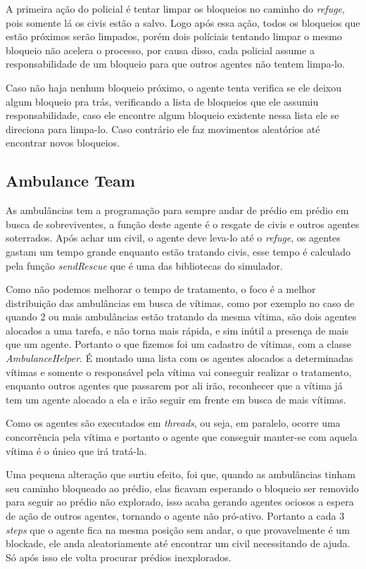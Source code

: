 \documentclass[conference]{IEEEtran}
\begin{document}
A primeira ação do policial é tentar limpar os bloqueios no caminho do \textit{refuge}, pois somente lá os civis estão a salvo. Logo após essa ação, todos os bloqueios que estão próximos serão limpados, porém dois políciais tentando limpar o mesmo bloqueio não acelera o processo, por causa disso, cada policial assume a responsabilidade de um bloqueio para que outros agentes não tentem limpa-lo.

Caso não haja nenhum bloqueio próximo, o agente tenta verifica se ele deixou algum bloqueio pra trás, verificando a lista de bloqueios que ele assumiu responsabilidade, caso ele encontre algum bloqueio existente nessa lista ele se direciona para limpa-lo. Caso contrário ele faz movimentos aleatórios até encontrar novos bloqueios.
\subsection{Ambulance Team}
As ambulâncias tem a programação para sempre andar de prédio em prédio em busca de sobreviventes, a função deste agente é o resgate de civis e outros agentes soterrados. 
Após achar um civil, o agente deve leva-lo até o \textit{refuge}, os agentes gastam um tempo grande enquanto estão tratando civis, esse tempo é calculado pela função \textit{sendRescue} que é uma das bibliotecas do simulador.

Como não podemos melhorar o tempo de tratamento, o foco é a melhor distribuição das ambulâncias em busca de vítimas, como por exemplo no caso de quando 2 ou mais ambulâncias estão tratando da mesma vítima, são dois agentes alocados a uma tarefa, e não torna mais rápida, e sim inútil a presença de mais que um agente. Portanto o que fizemos foi um cadastro de vítimas, com a classe \textit{AmbulanceHelper}. É montado uma lista com os agentes alocados a determinadas vítimas e somente o responsável pela vítima vai conseguir realizar o tratamento, enquanto outros agentes que passarem por ali irão, reconhecer que a vítima já tem um agente alocado a ela e irão seguir em frente em busca de mais vítimas.

Como os agentes são executados em \textit{threads}, ou seja, em paralelo, ocorre uma concorrência pela vítima e portanto o agente que conseguir manter-se com aquela vítima é o único que irá tratá-la.

Uma pequena alteração que surtiu efeito, foi que, quando as ambulâncias tinham seu caminho bloqueado ao prédio, elas ficavam esperando o bloqueio ser removido para seguir ao prédio não explorado, isso acaba gerando agentes ociosos a espera de ação de outros agentes, tornando o agente não pró-ativo. Portanto a cada 3 \textit{steps} que o agente fica na mesma posição sem andar, o que provavelmente é um blockade, ele anda  aleatoriamente até encontrar um civil necessitando de ajuda. Só após isso ele volta procurar prédios inexplorados. 
\end{document}
